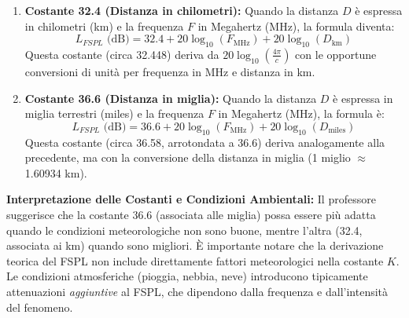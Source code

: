 \begin{enumerate}
    \item \textbf{Costante 32.4 (Distanza in chilometri):}
    Quando la distanza $D$ è espressa in chilometri (km) e la frequenza $F$ in Megahertz (MHz), la formula diventa:
    \begin{equation}
    L_{FSPL} \text{ (dB)} = 32.4 + 20 \log_{10}(F_{\text{MHz}}) + 20 \log_{10}(D_{\text{km}})
    \label{eq:fspl_km}
    \end{equation}
    Questa costante (circa 32.448) deriva da $20 \log_{10}\left(\frac{4\pi}{c}\right)$ con le opportune conversioni di unità per frequenza in MHz e distanza in km.

    \item \textbf{Costante 36.6 (Distanza in miglia):}
    Quando la distanza $D$ è espressa in miglia terrestri (miles) e la frequenza $F$ in Megahertz (MHz), la formula è:
    \begin{equation}
    L_{FSPL} \text{ (dB)} = 36.6 + 20 \log_{10}(F_{\text{MHz}}) + 20 \log_{10}(D_{\text{miles}})
    \label{eq:fspl_miles}
    \end{equation}
    Questa costante (circa 36.58, arrotondata a 36.6) deriva analogamente alla precedente, ma con la conversione della distanza in miglia (1 miglio $\approx$ 1.60934 km).
\end{enumerate}

\textbf{Interpretazione delle Costanti e Condizioni Ambientali:}
Il professore suggerisce che la costante 36.6 (associata alle miglia) possa essere più adatta quando le condizioni meteorologiche non sono buone, mentre l'altra (32.4, associata ai km) quando sono migliori.
È importante notare che la derivazione teorica del FSPL non include direttamente fattori meteorologici nella costante $K$. Le condizioni atmosferiche (pioggia, nebbia, neve) introducono tipicamente attenuazioni \textit{aggiuntive} al FSPL, che dipendono dalla frequenza e dall'intensità del fenomeno.

